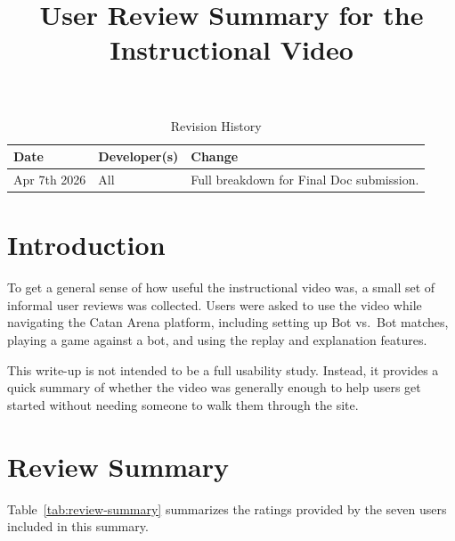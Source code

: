 \documentclass{article}
\title{User Review Summary for the Instructional Video\\\progname}
\author{\authname}
\date{}
\begin{document}
\maketitle

\tableofcontents

\listoftables

\newpage

\begin{table}[hp]
\caption{Revision History} \label{TblRevisionHistory}
\begin{tabularx}{\textwidth}{llX}
\toprule
\textbf{Date} & \textbf{Developer(s)} & \textbf{Change}\\
\midrule
Apr 7th 2026 & All & Full breakdown for Final Doc submission.\\
\bottomrule
\end{tabularx}
\end{table}

\newpage

\section{Introduction}

To get a general sense of how useful the instructional video was, a small set of
informal user reviews was collected. Users were asked to use the video while
navigating the Catan Arena platform, including setting up Bot vs.\ Bot matches,
playing a game against a bot, and using the replay and explanation features.

This write-up is not intended to be a full usability study. Instead, it provides a
quick summary of whether the video was generally enough to help users get started
without needing someone to walk them through the site.

\section{Review Summary}

Table~\ref{tab:review-summary} summarizes the ratings provided by the seven users
included in this summary.
\end{document}
